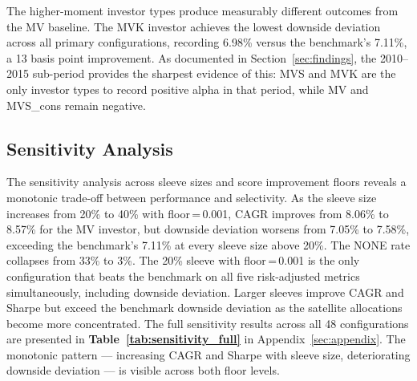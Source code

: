 \documentclass[12pt, a4paper]{article}
\begin{document}
The higher-moment investor types produce measurably different outcomes from the MV baseline.
The MVK investor achieves the lowest downside deviation across all primary configurations,
recording 6.98\% versus the benchmark's 7.11\%, a 13 basis point improvement. As
documented in Section~\ref{sec:findings}, the 2010--2015 sub-period provides the sharpest
evidence of this: MVS and MVK are the only investor types to record positive alpha in that
period, while MV and MVS\_cons remain negative.

\subsection{Sensitivity Analysis}

The sensitivity analysis across sleeve sizes and score improvement floors reveals a monotonic
trade-off between performance and selectivity. As the sleeve size increases from 20\% to 40\%
with floor\,=\,0.001, CAGR improves from 8.06\% to 8.57\% for the MV investor, but downside
deviation worsens from 7.05\% to 7.58\%, exceeding the benchmark's 7.11\% at every sleeve
size above 20\%. The NONE rate collapses from 33\% to 3\%. The 20\% sleeve with floor\,=\,0.001 is the only configuration that beats the benchmark on all five risk-adjusted metrics simultaneously, including downside deviation. Larger sleeves improve CAGR and Sharpe but exceed the benchmark downside deviation as the satellite allocations become more concentrated. The full sensitivity results across all 48 configurations are presented in \textbf{Table~\ref{tab:sensitivity_full}} in Appendix~\ref{sec:appendix}. The monotonic pattern --- increasing CAGR and Sharpe with sleeve size, deteriorating downside deviation --- is visible across both floor levels.

\clearpage
\end{document}
